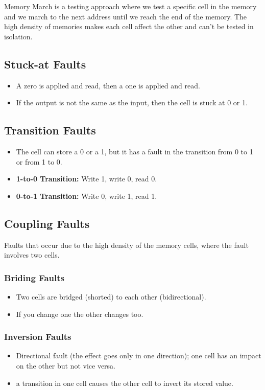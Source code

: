 \documentclass[11pt]{article}
\begin{document}
Memory March is a testing approach where we test a specific cell in the memory and we march to the next address until we reach the end of the memory. The high density of memories makes each cell affect the other and can't be tested in isolation.

\subsection*{Stuck-at Faults}
\begin{itemize}
    \item A zero is applied and read, then a one is applied and read.
    \item If the output is not the same as the input, then the cell is stuck at 0 or 1.
\end{itemize}

\subsection*{Transition Faults}
\begin{itemize}
    \item The cell can store a 0 or a 1, but it has a fault in the transition from 0 to 1 or from 1 to 0.
    \item \textbf{1-to-0 Transition:} Write 1, write 0, read 0.
    \item \textbf{0-to-1 Transition:} Write 0, write 1, read 1.
\end{itemize}

\subsection*{Coupling Faults}
Faults that occur due to the high density of the memory cells, where the fault involves two cells.
\subsubsection*{Briding Faults}
\begin{itemize}
    \item Two cells are bridged (shorted) to each other (bidirectional).
    \item If you change one the other changes too.
\end{itemize}

\subsubsection*{Inversion Faults}
\begin{itemize}
    \item Directional fault (the effect goes only in one direction); one cell has an impact on the other but not vice versa.
    \item a transition in one cell causes the other cell to invert its stored value.
\end{itemize}
\end{document}
